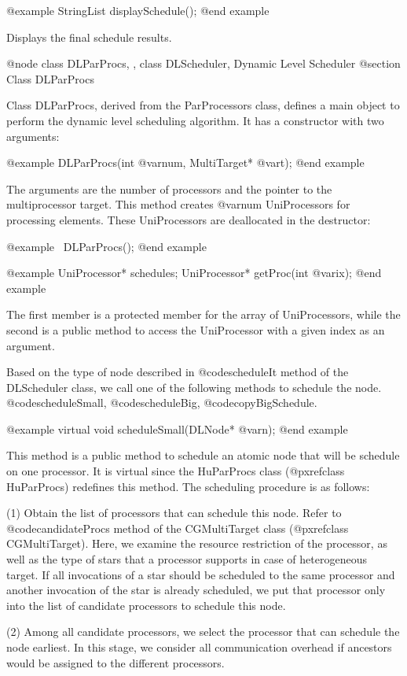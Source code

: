 @example
StringList displaySchedule();
@end example

Displays the final schedule results.

@node class DLParProcs, , class DLScheduler, Dynamic Level Scheduler
@section Class DLParProcs

Class DLParProcs, derived from the ParProcessors class,
defines a main object to perform the dynamic level scheduling algorithm. 
It has a constructor with two arguments:

@example
DLParProcs(int @var{num}, MultiTarget* @var{t});
@end example

The arguments are the number of processors and the pointer to the
multiprocessor target. This method creates @var{num} UniProcessors for
processing elements. These UniProcessors are deallocated in the destructor:

@example
~DLParProcs();
@end example

@example
UniProcessor* schedules;
UniProcessor* getProc(int @var{ix});
@end example

The first member is a protected member for the array of UniProcessors, while
the second is a public method to access the UniProcessor with a given index
as an argument.

Based on the type of node described in @code{scheduleIt} method of the
DLScheduler class, we call one of the following methods to schedule the node.
@code{scheduleSmall}, @code{scheduleBig}, @code{copyBigSchedule}.

@example
virtual void scheduleSmall(DLNode* @var{n});
@end example

This method is a public method to schedule an atomic node that will be
schedule on one processor. It is virtual since the HuParProcs class
(@pxref{class HuParProcs}) redefines this method.
The scheduling procedure is as follows:

(1) Obtain the list of processors that can schedule this node. Refer to
@code{candidateProcs} method of the CGMultiTarget
class (@pxref{class CGMultiTarget}).  Here, we
examine the resource restriction of the processor, as well as the type of
stars that a processor supports in case of heterogeneous target. If
all invocations of a star should be scheduled to the same processor and
another invocation of the star is already scheduled, we put that processor only
into the list of candidate processors to schedule this node.

(2) Among all candidate processors, we select the processor that can schedule
the node earliest. In this stage, we consider all communication overhead
if ancestors would be assigned to the different processors.

